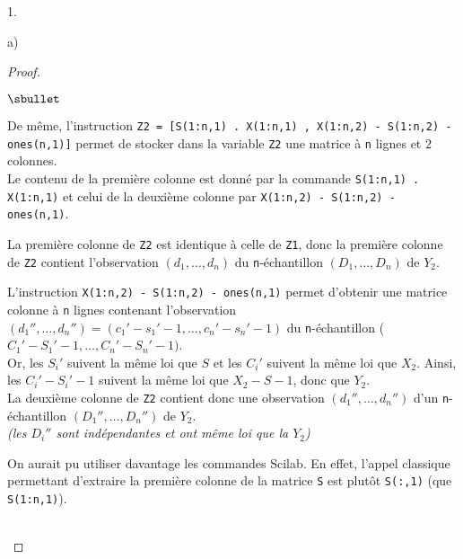 \documentclass[11pt]{article}%
\begin{document}
\begin{noliste}{1.}
\begin{noliste}{a)}
\begin{proof}
\begin{noliste}{$\sbullet$}
      \item De même, l'instruction {\tt  Z2 = [S(1:n,1) .\Sfois{} X(1:n,1) ,
          X(1:n,2) - S(1:n,2) - ones(n,1)]} permet de stocker dans la
        variable {\tt Z2} une matrice à {\tt n} lignes et $2$
        colonnes.\\
        Le contenu de la première colonne est donné par la commande
        {\tt S(1:n,1) .\Sfois{} X(1:n,1)} et celui de la deuxième
        colonne par {\tt  X(1:n,2) - S(1:n,2) - ones(n,1)}.
        
      \item La première colonne de {\tt Z2} est identique à celle de
        {\tt Z1}, donc la première colonne de {\tt Z2} contient
        l'observation $(d_1, \ldots, d_n)$ du {\tt n}-échantillon
        $(D_1, \ldots, D_n)$ de $Y_2$.
        
      \item L'instruction {\tt X(1:n,2) - S(1:n,2) - ones(n,1)}
        permet d'obtenir une matrice colonne à {\tt n} lignes
        contenant l'observation $(d_1'', \ldots, d_n'') =
        (c_1' - s_1' - 1, \ldots , c_n' - s_n' -1)$
        du {\tt n}-échantillon ($C_1' - S_1'-1, \ldots, C_n'- S_n' -1)$.\\
        Or, les $S_i'$ suivent la même loi que $S$ et les $C_i'$ suivent
        la même loi que $X_2$. Ainsi, les $C_i'-S_i'-1$ suivent la même
        loi que $X_2 - S-1$, donc que $Y_2$.\\ 
        La deuxième colonne de {\tt Z2} contient donc une observation $(d_1'',
        \ldots, d_n'')$ d'un {\tt n}-échantillon $(D_1'', \ldots, D_n'')$ de
        $Y_2$.\\
        {\it (les \var $D_i''$ sont indépendantes et ont même
          loi que la \var $Y_2$)}
      \end{noliste}
      \begin{remarkL}{.95}
        On aurait pu utiliser davantage les commandes Scilab{}. En
        effet, l'appel classique permettant d'extraire la première
        colonne de la matrice {\tt S} est plutôt {\tt S(:,1)}
        (que {\tt S(1:n,1)}).
      \end{remarkL}~\\[-1.4cm]
    \end{proof}


    \newpage
    

\end{noliste}
\end{noliste}
\end{document}
